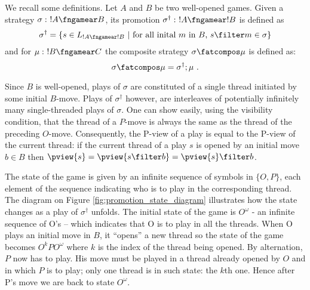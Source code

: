 We recall some definitions. Let $A$ and $B$ be two well-opened
games. Given a strategy  $\sigma :\ !A \fngamear B$, its promotion
$\sigma^\dag :\ !A\fngamear !B$ is defined as
$$ \sigma^\dag = \{ s \in L_{!A\fngamear !B}\ |\ \mbox{for all inital $m$ in $B$, } s\filter m \in \sigma \}$$
and for $\mu :\ !B\fngamear C$ the composite strategy $\sigma
\fatcompos \mu$ is defined as:
$$ \sigma \fatcompos \mu = \sigma^\dag ; \mu \ .$$

Since $B$ is well-opened, plays of $\sigma$ are constituted of a
single thread initiated by some initial $B$-move. Plays of
$\sigma^\dag$ however, are interleaves of potentially infinitely many single-threaded
plays of $\sigma$. One can show easily, using the visibility condition, that the thread of a $P$-move
is always the same as the thread of the preceding $O$-move. Consequently, the P-view of a play is equal to the P-view of the current thread:
if the current thread of a play $s$ is opened by an initial move $b \in B$ then
$\pview{s} = \pview{s \filter b} = \pview{s} \filter b$.


The state of the game is given by an infinite sequence of symbols in $\{O, P\}$, each element of the
sequence indicating who is to play in the corresponding thread.
The diagram on Figure \ref{fig:promotion_state_diagram} illustrates
how the state changes as a play of $\sigma^\dag$ unfolds.
The initial state of the game is $O^\omega$ - an infinite
sequence of O's -- which indicates that O is to play in all the
threads. When O plays an initial move in $B$, it ``opens'' a new
thread so the state of the game becomes $O^k P O^\omega$ where $k$
is the index of the thread being opened. By alternation, $P$ now has to play. His move must be played in a thread
already opened by $O$ and in which $P$ is to play; only one thread is in such state: the $k$th one. Hence after P's move
we are back to state $O^\omega$.

